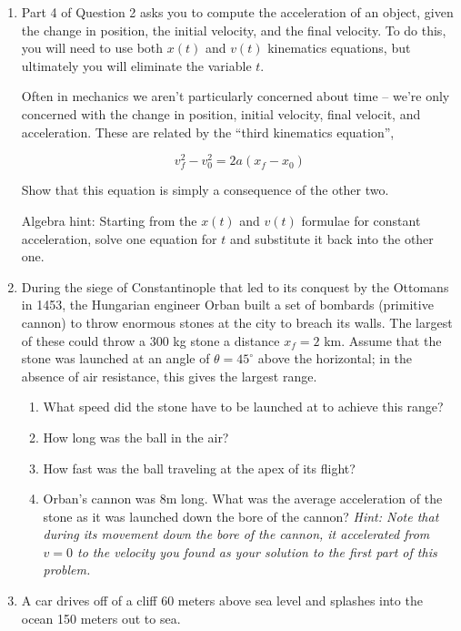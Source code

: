 \documentclass[12pt]{article}
\begin{document}
\Large
\centerline{}
\normalsize

\begin{enumerate}

\item Part 4 of Question 2 asks you to compute the acceleration of an object, given the change in position, the initial velocity, and the final velocity. To do this, you will need to use both $x(t)$ and $v(t)$ kinematics equations, but ultimately you will eliminate the variable $t$.

Often in mechanics we aren't particularly concerned about time -- we're only concerned with the change in position, initial velocity, final velocit, and acceleration.
These are related by the ``third kinematics equation'', 

$$
v_f^2 - v_0^2 = 2a(x_f - x_0)
$$

Show that this equation is simply a consequence of the other two.

Algebra hint: Starting from the $x(t)$ and $v(t)$ formulae for constant acceleration, solve one equation for $t$ and substitute it back into the other one.


\item During the siege of Constantinople that led to its conquest by the Ottomans in 1453, the Hungarian engineer Orban built a set of bombards (primitive cannon) to throw enormous stones at the city to breach its walls. The largest of these could throw a 300 kg stone a distance $x_f=2$ km. Assume that the stone was launched at an angle of $\theta=45^\circ$ above the horizontal; in the absence of air resistance, this gives the largest range.

\begin{enumerate}

\item What speed did the stone have to be launched at to achieve this range?
\item How long was the ball in the air?
\item How fast was the ball traveling at the apex of its flight?
\item Orban's cannon was 8m long. What was the average acceleration of the stone as it was launched down the bore of the cannon? {\it Hint: Note that during its movement down the bore of the cannon, it accelerated from $v=0$ to the velocity you found as your solution to the first part of this problem.}
\end{enumerate}

\item A car drives off of a cliff 60 meters above sea level and splashes into the ocean 150 meters out to sea.


\end{enumerate}
\end{document}
